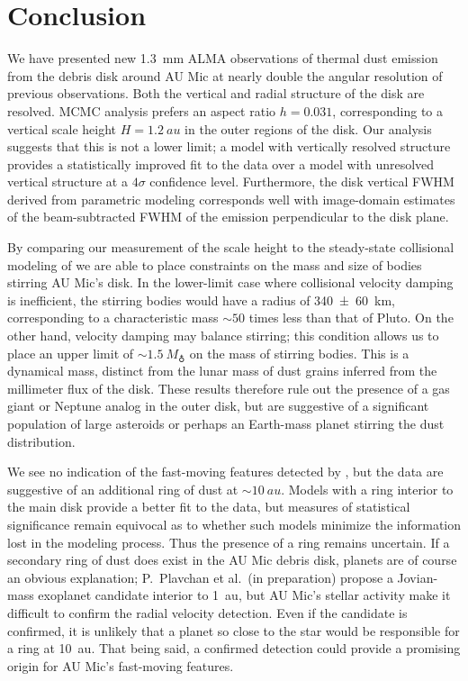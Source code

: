 \documentclass[12pt,oneside]{book}
\begin{document}
\clearpage
\chapter{Conclusion}
\label{chapter: conclusion}

We have presented new \SI{1.3}{mm} ALMA observations of thermal dust emission from the debris disk around AU Mic at nearly double the angular resolution of previous observations. 
Both the vertical and radial structure of the disk are resolved.
MCMC analysis prefers an aspect ratio $h = 0.031$, corresponding to a vertical scale height $H = \SI{1.2}{au}$ in the outer regions of the disk.
Our analysis suggests that this is not a lower limit; a model with vertically resolved structure provides a statistically improved fit to the data over a model with unresolved vertical structure at a $4 \sigma$ confidence level.
Furthermore, the disk vertical FWHM derived from parametric modeling corresponds well with image-domain estimates of the beam-subtracted FWHM of the emission perpendicular to the disk plane.

By comparing our measurement of the scale height to the steady-state collisional modeling of \cite{pan&schlichting12} we are able to place constraints on the mass and size of bodies stirring AU Mic's disk.
In the lower-limit case where collisional velocity damping is inefficient, the stirring bodies would have a radius of \SI{340 \pm 60}{km}, corresponding to a characteristic mass $\sim 50$ times less than that of Pluto.
On the other hand, velocity damping may balance stirring; this condition allows us to place an upper limit of $\sim \SI{1.5}{M_\earth}$ on the mass of stirring bodies.
This is a dynamical mass, distinct from the lunar mass of dust grains inferred from the millimeter flux of the disk.
These results therefore rule out the presence of a gas giant or Neptune analog in the outer disk, but are suggestive of a significant population of large asteroids or perhaps an Earth-mass planet stirring the dust distribution.  

We see no indication of the fast-moving features detected by \cite{boccaletti15}, but the data are suggestive of an additional ring of dust at $\sim \SI{10}{au}$.
Models with a ring interior to the main disk provide a better fit to the data, but measures of statistical significance remain equivocal as to whether such models minimize the information lost in the modeling process.
Thus the presence of a ring remains uncertain.
If a secondary ring of dust does exist in the AU Mic debris disk, planets are of course an obvious explanation; P.~Plavchan et al.~(in preparation) propose a Jovian-mass exoplanet candidate interior to \SI{1}{au}, but AU Mic's stellar activity make it difficult to confirm the radial velocity detection.
Even if the candidate is confirmed, it is unlikely that a planet so close to the star would be responsible for a ring at \SI{10}{au}.
That being said, a confirmed detection could provide a promising origin for AU Mic's fast-moving features.
\end{document}
